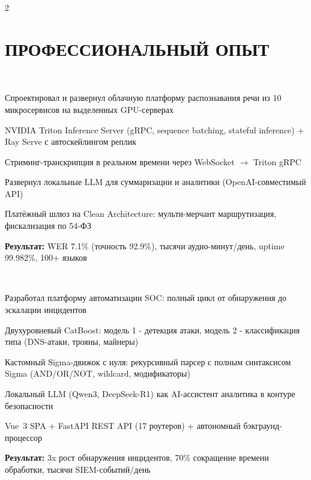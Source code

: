 \documentclass[]{deedy-resume-reversed}
\begin{document}
\begin{paracol}{2}


\section{ПРОФЕССИОНАЛЬНЫЙ ОПЫТ}

\\
\begin{tightemize}
\item Спроектировал и развернул облачную платформу распознавания речи из 10 микросервисов на выделенных GPU-серверах
\item NVIDIA Triton Inference Server (gRPC, sequence batching, stateful inference) + Ray Serve с автоскейлингом реплик
\item Стриминг-транскрипция в реальном времени через WebSocket $\rightarrow$ Triton gRPC
\item Развернул локальные LLM для суммаризации и аналитики (OpenAI-совместимый API)
\item Платёжный шлюз на Clean Architecture: мульти-мерчант маршрутизация, фискализация по 54-ФЗ
\item \textbf{Результат:} WER 7.1\% (точность 92.9\%), тысячи аудио-минут/день, uptime 99.982\%, 100+ языков
\end{tightemize}
\sectionsep

\\
\begin{tightemize}
\item Разработал платформу автоматизации SOC: полный цикл от обнаружения до эскалации инцидентов
\item Двухуровневый CatBoost: модель 1 - детекция атаки, модель 2 - классификация типа (DNS-атаки, трояны, майнеры)
\item Кастомный Sigma-движок с нуля: рекурсивный парсер с полным синтаксисом Sigma (AND/OR/NOT, wildcard, модификаторы)
\item Локальный LLM (Qwen3, DeepSeek-R1) как AI-ассистент аналитика в контуре безопасности
\item Vue~3 SPA + FastAPI REST API (17 роутеров) + автономный бэкграунд-процессор
\item \textbf{Результат:} 3x рост обнаружения инцидентов, 70\% сокращение времени обработки, тысячи SIEM-событий/день
\end{tightemize}
\sectionsep


\end{paracol}
\end{document}
